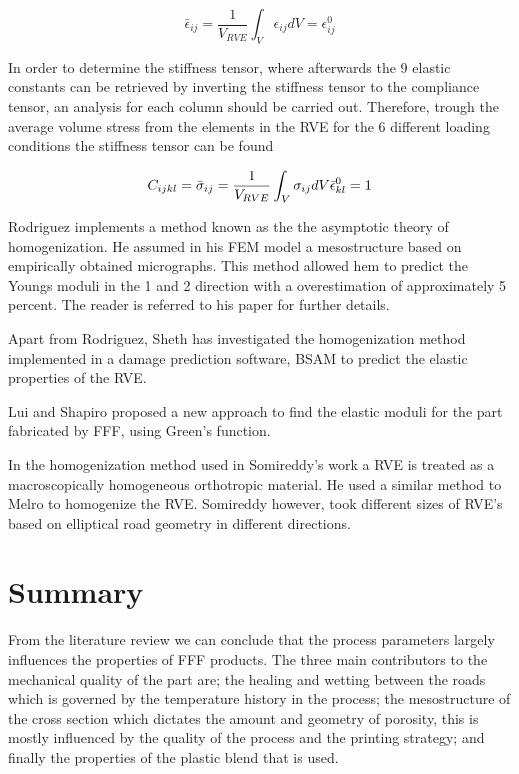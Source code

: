 \begin{equation}\label{Somireddy2}
\bar{\epsilon}_{ij}=\frac{1}{V_{RVE}}\int_V \epsilon_{ij}dV=\epsilon_{ij}^0
\end{equation}

In order to determine the stiffness tensor, where afterwards the 9 elastic constants can be retrieved by inverting the stiffness tensor to the compliance tensor, an analysis for each column should be carried out. Therefore, trough the average volume stress from the elements in the RVE for the 6 different loading conditions the stiffness tensor can be found

\begin{equation}\label{eqn:homogenization}
C_{ijkl}=\bar{\sigma}_{ij}=\frac{1}{V_{RVE}}\int_V \sigma_{ij}dV \\ 
\bar{\epsilon}_{kl}^0=1
\end{equation}


Rodriguez \cite{Rodriguez2003MechanicalModeling} implements a method known as the the asymptotic theory of homogenization. He assumed in his FEM model a mesostructure based on empirically obtained micrographs. This method allowed hem to predict the Youngs moduli in the 1 and 2 direction with a overestimation of approximately 5 percent.  The reader is referred to his paper for further details.

Apart from Rodriguez, Sheth \cite{Sheth2017NumericalOrientation} has investigated the homogenization method implemented in a damage prediction software, BSAM to predict the elastic properties of the RVE.

Lui and Shapiro \cite{Liu2016HomogenizationStructures} proposed a new approach to find the elastic moduli for the part fabricated by FFF, using Green's function. 

In the homogenization method used in Somireddy's work \cite{Somireddy2018DevelopmentFDM} a RVE is treated as a macroscopically homogeneous orthotropic material. He used a similar method to Melro to homogenize the RVE. Somireddy however, took different sizes of RVE's based on  elliptical road geometry in different directions.

\section{Summary}
From the literature review we can conclude that the process parameters largely influences the properties of FFF products. The three main contributors to the mechanical quality of the part are; the healing and wetting between the roads which is governed by the temperature history in the process; the mesostructure of the cross section which dictates the amount and geometry of porosity, this is mostly influenced by the quality of the process and the printing strategy; and finally the properties of the plastic blend that is used. 

